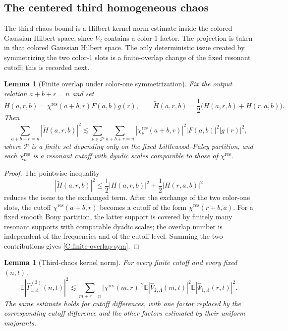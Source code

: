 \documentclass[10pt]{amsart}
\numberwithin{equation}{section}
\theoremstyle{plain}
\newtheorem{lemma}[theorem]{Lemma}
\theoremstyle{definition}
\theoremstyle{remark}
\newcommand{\E}{\mathbb{E}}
\newcommand{\wh}{\widehat}
\begin{document}
\subsection{The centered third homogeneous chaos}

The third-chaos bound is a Hilbert-kernel norm estimate inside the colored Gaussian Hilbert space, since \(V_2\) contains a color-1 factor.  The projection is taken in that colored Gaussian Hilbert space.  The only deterministic issue created by symmetrizing the two color-1 slots is a finite-overlap change of the fixed resonant cutoff; this is recorded next.


\begin{lemma}[Finite overlap under color-one symmetrization]\label{lem:C-finite-overlap-sym}
Fix the output relation $a+b+r=n$ and set
\[
        H(a,r,b)=\chi^{\mathrm{res}}(a+b,r)F(a,b)g(r),
        \qquad
        \widetilde H(a,r,b)=\frac12\bigl(H(a,r,b)+H(r,a,b)\bigr).
\]
Then
\begin{equation}\label{C:finite-overlap-sym}
        \sum_{a+b+r=n}|\widetilde H(a,r,b)|^2
        \lesssim
        \sum_{\nu\in\mathcal P}
        \sum_{a+b+r=n}|\chi_\nu^{\mathrm{res}}(a+b,r)|^2|F(a,b)|^2|g(r)|^2,
\end{equation}
where $\mathcal P$ is a finite set depending only on the fixed Littlewood--Paley partition, and each $\chi_\nu^{\mathrm{res}}$ is a resonant cutoff with dyadic scales comparable to those of $\chi^{\mathrm{res}}$.
\end{lemma}

\begin{proof}
The pointwise inequality
\[
        |\widetilde H(a,r,b)|^2
        \le \frac12|H(a,r,b)|^2+\frac12|H(r,a,b)|^2
\]
reduces the issue to the exchanged term.  After the exchange of the two color-one slots, the cutoff $\chi^{\mathrm{res}}(a+b,r)$ becomes a cutoff of the form $\chi^{\mathrm{res}}(r+b,a)$.  For a fixed smooth Bony partition, the latter support is covered by finitely many resonant supports with comparable dyadic scales; the overlap number is independent of the frequencies and of the cutoff level.  Summing the two contributions gives \eqref{C:finite-overlap-sym}.
\end{proof}

\begin{lemma}[Third-chaos kernel norm]\label{lem:C-third-kernel-norm}
For every finite cutoff and every fixed \((n,t)\),
\begin{equation}\label{C:third-kernel-norm}
        \E|\wh\Gamma_{1,\Lambda}^{(3)}(n,t)|^2
        \lesssim
        \sum_{m+r=n}|\chi^{\mathrm{res}}(m,r)|^2
        \E|\wh V_{2,\Lambda}(m,t)|^2
        \E|\wh\Psi_{1,\Lambda}(r,t)|^2.
\end{equation}
The same estimate holds for cutoff differences, with one factor replaced by the corresponding cutoff difference and the other factors estimated by their uniform majorants.
\end{lemma}
\end{document}

